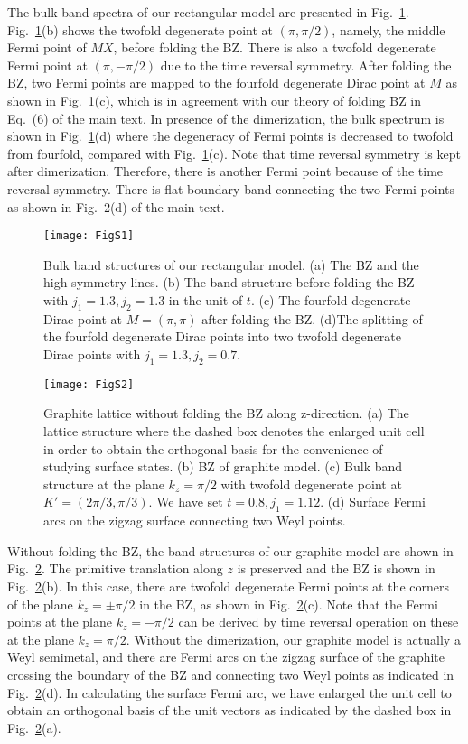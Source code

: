 \documentclass[aps,prl,twocolumn,noshowpacs,superscriptaddress]{revtex4-1}
\begin{document}
The bulk band spectra of our rectangular model are presented in Fig.~\ref{figs2}. Fig.~\ref{figs2}(b) shows the twofold degenerate point at $ (\pi,\pi/2) $, namely, the middle Fermi point of $ MX $, before folding the BZ. There is also a twofold degenerate Fermi point at $ (\pi,-\pi/2) $ due to the time reversal symmetry. After folding the BZ, two Fermi points are mapped to the fourfold degenerate Dirac point at $ M $ as shown in Fig.~\ref{figs2}(c), which is in agreement with our theory of folding BZ in Eq.~(6) of the main text. In presence of the dimerization, the bulk spectrum is shown in Fig.~\ref{figs2}(d) where the degeneracy of Fermi points is decreased to twofold from fourfold, compared with Fig.~\ref{figs2}(c). Note that time reversal symmetry is kept after dimerization. Therefore, there is another Fermi point because of the time reversal symmetry. There is flat boundary band connecting the two Fermi points as shown in Fig.~2(d) of the main text.

\begin{figure}[h]
	\centering
	\texttt{[image: FigS1]}
	\caption{Bulk band structures of our rectangular model. (a) The BZ and the high symmetry lines. (b) The band structure before folding the BZ with $j_1=1.3,j_2=1.3$ in the unit of $ t $. (c) The fourfold degenerate Dirac point at $M=(\pi,\pi)$ after folding the BZ. (d)The splitting of the fourfold degenerate Dirac points into two twofold degenerate Dirac points with $j_1=1.3,j_2=0.7$.}
	\label{figs2}
\end{figure}

\begin{figure}[h]
	\centering
	\texttt{[image: FigS2]}
	\caption{Graphite lattice without folding the BZ along z-direction. (a) The lattice structure where the dashed box denotes the enlarged unit cell in order to obtain the orthogonal basis for the convenience of studying surface states.  (b) BZ of graphite model. (c) Bulk band structure at the plane $k_z=\pi/2$ with twofold degenerate point at $K'=(2\pi/3,\pi/3 )$. We have set $t=0.8,j_1=1.12$. (d) Surface Fermi arcs on the zigzag surface connecting two Weyl points.}
	\label{figs3}
\end{figure}

Without folding the BZ, the band structures of our graphite model are shown in Fig.~\ref{figs3}. The primitive translation along $ z $ is preserved and the BZ is shown in Fig.~\ref{figs3}(b).  In this case, there are twofold degenerate Fermi points at the corners of the plane $ k_z=\pm\pi/2 $ in the BZ, as shown in Fig.~\ref{figs3}(c). Note that the Fermi points at the plane $ k_z=-\pi/2 $ can be derived by time reversal operation on these at the plane $ k_z=\pi/2 $. Without the dimerization, our graphite model is actually a Weyl semimetal, and there are Fermi arcs on the zigzag surface of the graphite crossing the boundary of the BZ and connecting two Weyl points as indicated in Fig.~\ref{figs3}(d). In calculating the surface Fermi arc, we have enlarged the unit cell to obtain an orthogonal basis of the unit vectors as indicated by the dashed box in Fig.~\ref{figs3}(a).
\end{document}
